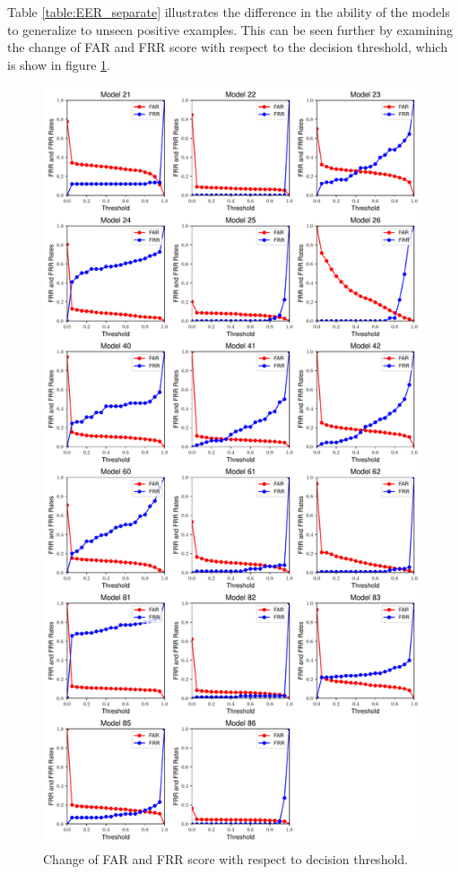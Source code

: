 Table \ref{table:EER_separate} illustrates the difference in the ability of the models to generalize to unseen positive examples. This can be seen further by examining the change of FAR and FRR score with respect to the decision threshold, which is show in figure \ref{fig:far_ffr_all_thresholds}. 

\begin{figure}[H]
	\centering
	\includegraphics[width=.8\textwidth]{images/far_frr_curves_all_models_subplots.pdf} %
	\caption{Change of FAR and FRR score with respect to decision threshold.}
	\label{fig:far_ffr_all_thresholds}
\end{figure}

